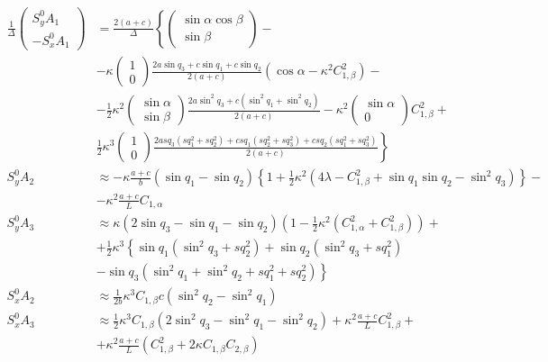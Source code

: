 \begin{equation*}
	\begin{aligned}
		\frac{1}{\Delta}\begin{pmatrix}S_y^0A_1 \\ -S_x^0A_1\end{pmatrix} & = \frac{2\left(a+c\right)}{\Delta}\left\lbrace\begin{pmatrix}\sin\alpha\cos\beta \\ \sin\beta\end{pmatrix}- \right.\\
		& \left. -\kappa\begin{pmatrix}1\\0\end{pmatrix}\frac{2a\sin{q_3}+c\sin{q_1}+c\sin{q_2}}{2\left(a+c\right)}\left(\cos\alpha-\kappa^2C_{1,\beta}^2\right) - \right.\\
		& \left. -\frac{1}{2}\kappa^2 \begin{pmatrix} \sin{\alpha} \\ \sin{\beta} \end{pmatrix} \frac{2a\sin^2{q_3}+c\left(\sin^2{q_1}+\sin^2{q_2}\right)}{2\left(a+c\right)}-\kappa^2 \begin{pmatrix} \sin{\alpha} \\ 0 \end{pmatrix} C^2_{1,\beta} + \right.\\
		& \left. \frac{1}{2} \kappa^3 \begin{pmatrix} 1 \\ 0 \end{pmatrix} \frac{2asq_3 \left(sq_1^2+sq_2^2 \right) + csq_1\left( sq_2^2+sq_3^2 \right) + csq_2\left(sq_1^2+sq_3^2\right)}{2\left(a+c\right)} \right\rbrace\\
		 S_y^0 A_2 & \approx -\kappa \frac{a+c}{b} \left( \sin{q_1} - \sin{q_2} \right) \left\lbrace 1 + \frac{1}{2} \kappa^2 \left(4\lambda - C^2_{1,\beta} + \sin{q_1} \sin{q_2} - \sin^2{q_3}\right) \right\rbrace -\\
		& -\kappa^2\frac{a+c}{L}C_{1,\alpha}\\
		S_y^0 A_3 & \approx \kappa\left(2\sin{q_3} - \sin{q_1} - \sin{q_2}\right) \left(1 - \frac{1}{2}\kappa^2\left(C^2_{1,\alpha} + C^2_{1,\beta}\right)\right) + \\
		& + \frac{1}{2}\kappa^3 \left\lbrace \sin{q_1}\left(\sin^2{q_3} + sq^2_2\right) + \sin{q_2}\left(\sin^2{q_3} + sq^2_1\right)\right.\\
		&\left. -\sin{q_3}\left(\sin^2{q_1} + \sin^2{q_2} + sq^2_1 + sq^2_2\right)\right\rbrace \\
		S^0_x A_2 & \approx \frac{1}{2b}\kappa^3 C_{1,\beta}c\left(\sin^2{q_2} - \sin^2{q_1}\right) \\
		S^0_x A_3 & \approx \frac{1}{2}\kappa^3 C_{1,\beta}\left(2\sin^2{q_3} - \sin^2{q_1} - \sin^2{q_2}\right) + \kappa^2\frac{a+c}{L}C^2_{1,\beta} + \\
		& + \kappa^2\frac{a+c}{L}\left(C^2_{1,\beta} + 2\kappa C_{1,\beta}C_{2,\beta}\right)
	\end{aligned}
\end{equation*}


